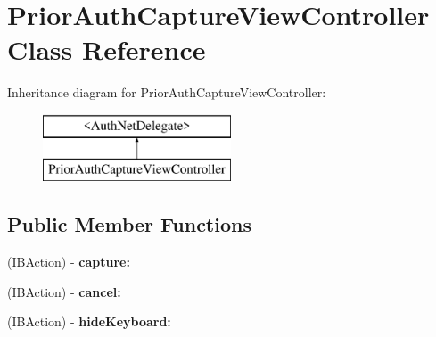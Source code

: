 \hypertarget{interface_prior_auth_capture_view_controller}{
\section{PriorAuthCaptureViewController Class Reference}
\label{interface_prior_auth_capture_view_controller}
}
Inheritance diagram for PriorAuthCaptureViewController:\begin{figure}[H]
\begin{center}
\leavevmode
\includegraphics[height=2.000000cm]{interface_prior_auth_capture_view_controller}
\end{center}
\end{figure}
\subsection*{Public Member Functions}
\begin{DoxyCompactItemize}
\item 
\hypertarget{interface_prior_auth_capture_view_controller_aebed59d69a2ef7f0dad5f9b9b25c72aa}{
(IBAction) -\/ {\bfseries capture:}}
\label{interface_prior_auth_capture_view_controller_aebed59d69a2ef7f0dad5f9b9b25c72aa}

\item 
\hypertarget{interface_prior_auth_capture_view_controller_af8292e8a93b22c1deb3592661b14d7a8}{
(IBAction) -\/ {\bfseries cancel:}}
\label{interface_prior_auth_capture_view_controller_af8292e8a93b22c1deb3592661b14d7a8}

\item 
\hypertarget{interface_prior_auth_capture_view_controller_a43a78b5b2c97ce135b4a8052c6d7f984}{
(IBAction) -\/ {\bfseries hideKeyboard:}}
\label{interface_prior_auth_capture_view_controller_a43a78b5b2c97ce135b4a8052c6d7f984}

\end{DoxyCompactItemize}
